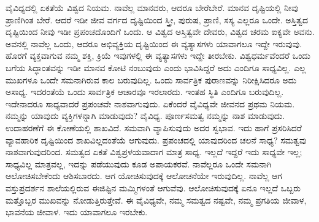 ವೈವಿಧ್ಯದಲ್ಲಿ ಏಕತೆಯೆ ವಿಶ್ವದ ನಿಯಮ. ನಾವೆಲ್ಲ ಮಾನವರು, ಆದರೂ ಬೇರೆಬೇರೆ. ಮಾನವ ದೃಷ್ಟಿಯಲ್ಲಿ ನೀವು ಪ್ರಾಣಿಗಿಂತ ಬೇರೆ. ಆದರೆ ಇಡೀ ಜೀವ ವರ್ಗದ ದೃಷ್ಟಿಯಿಂದ ಸ್ತ್ರೀ, ಪುರುಷ, ಪ್ರಾಣಿ, ಸಸ್ಯ ಎಲ್ಲರೂ ಒಂದೇ. ಅಸ್ತಿತ್ವದ ದೃಷ್ಟಿಯಿಂದ ನೀವು ಇಡೀ ಪ್ರಪಂಚದೊಂದಿಗೆ ಒಂದು. ಆ ವಿಶ್ವದ ಅಸ್ತಿತ್ವವೇ ದೇವರು, ವಿಶ್ವದ ಚರಮ ಐಕ್ಯವೇ ಅವನು. ಅವನಲ್ಲಿ ನಾವೆಲ್ಲ ಒಂದು, ಆದರೂ ಅಭಿವ್ಯಕ್ತಿಯ ದೃಷ್ಟಿಯಿಂದ ಈ ವ್ಯತ್ಯಾಸಗಳು ಯಾವಾಗಲೂ ಇದ್ದೇ ಇರುವುವು. ಹೊರಗೆ ವ್ಯಕ್ತವಾಗುವ ನಮ್ಮ ಶಕ್ತಿ, ಕ್ರಿಯೆ ಇವುಗಳಲ್ಲಿ ಈ ವ್ಯತ್ಯಾಸಗಳು ಇದ್ದೇ ತೀರಬೇಕು. ವಿಶ್ವಧರ್ಮವೆಂದರೆ ಒಂದು ಬಗೆಯ ಸಿದ್ಧಾಂತವನ್ನು ಇಡೀ ಮಾನವ ಕೋಟಿ ನಂಬುವುದು ಎಂದು ಭಾವಿಸಿದ್ದರೆ ಅದು ಎಂದಿಗೂ ಸಾಧ್ಯವಿಲ್ಲ. ಎಲ್ಲ ಮುಖಗಳೂ ಒಂದೇ ಸಮನಾಗಿರುವ ಕಾಲ ಬರುವುದಿಲ್ಲ. ಒಂದು ಸಾರ್ವತ್ರಿಕ ಪುರಾಣವನ್ನು ನಿರೀಕ್ಷಿಸಿದರೂ ಅದು ಅಸಾಧ್ಯ. ಇದರಂತೆಯೆ ಒಂದು ಸಾರ್ವತ್ರಿಕ ಆಚಾರವೂ ಇರಲಾರದು. ಇಂತಹ ಸ್ಥಿತಿ ಎಂದಿಗೂ ಬರುವುದಿಲ್ಲ. ಇದೇನಾದರೂ ಸಾಧ್ಯವಾದರೆ ಪ್ರಪಂಚವೇ ನಾಶವಾಗುವುದು. ಏಕೆಂದರೆ ವೈವಿಧ್ಯವೇ ಜೀವನದ ಪ್ರಥಮ ನಿಯಮ. ನಮ್ಮನ್ನು ಯಾವುದು ವ್ಯಕ್ತಿಗಳನ್ನಾಗಿ ಮಾಡುವುದು? ವೈವಿಧ್ಯ. ಪೂರ್ಣಸಮತ್ವ ನಮ್ಮನ್ನು ನಾಶ ಮಾಡುವುದು. ಉದಾಹರಣೆಗೆ ಈ ಕೋಣೆಯಲ್ಲಿ ಶಾಖವಿದೆ. ಸಮವಾಗಿ ವ್ಯಾಪಿಸುವುದು ಅದರ ಸ್ವಭಾವ. ಇದು ಹಾಗೆ ಪ್ರಸರಿಸಿದರೆ ವ್ಯಾವಹಾರಿಕ ದೃಷ್ಟಿಯಿಂದ ಶಾಖವಿಲ್ಲದಂತೆಯೆ ಆಗುವುದು. ಪ್ರಪಂಚದಲ್ಲಿ ಯಾವುದರಿಂದ ಚಲನೆ ಸಾಧ್ಯ? ಸಮತ್ವವು ನಾಶವಾಗುವುದರಿಂದ. ಸಮತ್ವದ ಏಕತೆ ವಿಶ್ವಪ್ರಳಯವಾದಾಗ ಮಾತ್ರ ಸಾಧ್ಯ. ಇಲ್ಲದೆ ಇದ್ದರೆ ಇದು ಸಾಧ್ಯವೇ ಇಲ್ಲ; ಸಾಧ್ಯವಿಲ್ಲ ಮಾತ್ರವಲ್ಲ, ಇದನ್ನು ಪಡೆಯುವುದು ಕೂಡ ಅಪಾಯಕರವೆ. ನಾವೆಲ್ಲರೂ ಒಂದೇ ಸಮನಾಗಿ ಆಲೋಚಿಸಬೇಕೆಂದು ಆಶಿಸಬಾರದು. ಆಗ ಯೋಚಿಸುವುದಕ್ಕೆ ಆಲೋಚನೆಯೇ ಇರುವುದಿಲ್ಲ. ನಾವೆಲ್ಲ ಆಗ ವಸ್ತುಪ್ರದರ್ಶನ ಶಾಲೆಯಲ್ಲಿರುವ ಈಜಿಪ್ಟಿನ ಮಮ್ಮಿಗಳಂತೆ ಆಗುವೆವು. ಆಲೋಚಿಸುವುದಕ್ಕೆ ಏನೂ ಇಲ್ಲದೆ ಒಬ್ಬರು ಮತ್ತೊಬ್ಬರ ಮುಖವನ್ನು ನೋಡುತ್ತಿರುತ್ತೇವೆ. ಈ ವೈವಿಧ್ಯವೇ, ನಮ್ಮ ಸಮತ್ವದ ನಷ್ಟವೇ, ನಮ್ಮ ಪ್ರಗತಿಯ ಜೀವಾಳ, ಭಾವನೆಯ ಜೀವಾಳ. ಇದು ಯಾವಾಗಲೂ ಇರಬೇಕು.

\vskip 5pt

